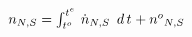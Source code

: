 \documentclass[border=2pt]{standalone}
\begin{document}
${n}{_{N, S}}=\int_{ {{t^o}}{_{}} }^{ {{t^e}}{_{}} } \, {{\dot{n}}}{_{N, S}} \enskip d\,{t}{_{}}  + {{n^o}}{_{N, S}}$
\end{document}
